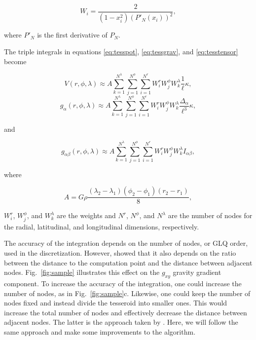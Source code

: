\begin{equation}
    W_i = \frac{2}{(1 - x_i^2)(P'_N(x_i))^2},
\end{equation}

\noindent
where $P'_N$ is the first derivative of $P_N$.

The triple integrals in equations
\ref{eq:tesspot},
\ref{eq:tessgrav},
and
\ref{eq:tesstensor}
become

\begin{equation}
    V(r,\phi,\lambda) \approx
        A
        \sum\limits_{k=1}^{N^{\lambda}}
        \sum\limits_{j=1}^{N^{\phi}}
        \sum\limits_{i=1}^{N^r}
        W^r_i W^{\phi}_j W^{\lambda}_k
        \frac{1}{\ell} \kappa,
\end{equation}
\begin{equation}
    g_{\alpha}(r,\phi,\lambda) \approx
        A
        \sum\limits_{k=1}^{N^{\lambda}}
        \sum\limits_{j=1}^{N^{\phi}}
        \sum\limits_{i=1}^{N^r}
        W^r_i W^{\phi}_j W^{\lambda}_k
        \frac{\Delta_{\alpha}}{\ell^3} \kappa,
\end{equation}

\noindent
and

\begin{equation}
    g_{\alpha\beta}(r,\phi,\lambda) \approx
        A
        \sum\limits_{k=1}^{N^{\lambda}}
        \sum\limits_{j=1}^{N^{\phi}}
        \sum\limits_{i=1}^{N^r}
        W^r_i W^{\phi}_j W^{\lambda}_k
        I_{\alpha\beta},
\end{equation}

\noindent
where

\begin{equation}
    A = G \rho
    \frac{(\lambda_2 - \lambda_1)(\phi_2 - \phi_1)(r_2 - r_1)}{8},
\end{equation}

\noindent
$W_i^r$, $W_j^{\phi}$, and $W_k^{\lambda}$
are the weights
and $N^r$, $N^{\phi}$, and $N^{\lambda}$
are the number of nodes
for the radial, latitudinal, and longitudinal dimensions, respectively.

The accuracy of the integration
depends on the number of nodes, or GLQ order,
used in the discretization.
However, \citet{Ku1977} showed
that it also depends on the ratio between
the distance to the computation point
and the distance between adjacent nodes.
Fig.~\ref{fig:sample}
illustrates this effect
on the $g_{xy}$ gravity gradient component.
To increase the accuracy of the integration,
one could increase the number of nodes,
as in Fig.~\ref{fig:sample}c.
Likewise,
one could keep the number of nodes fixed
and instead divide the tesseroid into smaller ones.
This would increase the total number of nodes
and effectively decrease
the distance between adjacent nodes.
The latter is the approach
taken by \citet{Li2011}.
Here, we will follow the same approach
and make some improvements to the algorithm.

